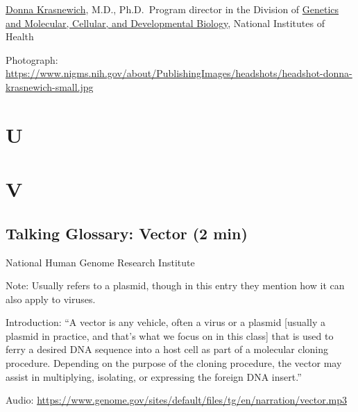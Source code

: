 \documentclass[
]{book}
\begin{document}
\href{https://www.nigms.nih.gov/about/Pages/krasnewich.aspx}{Donna Krasnewich}, M.D., Ph.D.~Program director in the Division of \href{https://www.nigms.nih.gov/about/overview/Pages/GMCDB.aspx}{Genetics and Molecular, Cellular, and Developmental Biology}, National Institutes of Health

Photograph: \url{https://www.nigms.nih.gov/about/PublishingImages/headshots/headshot-donna-krasnewich-small.jpg}

\hypertarget{u}{%
\chapter{U}\label{u}}

\hypertarget{v}{%
\chapter{V}\label{v}}

\hypertarget{talking-glossary-vector-2-min}{%
\section{Talking Glossary: Vector (2 min)}\label{talking-glossary-vector-2-min}}

National Human Genome Research Institute

Note: Usually refers to a plasmid, though in this entry they mention how it can also apply to viruses.

Introduction: ``A vector is any vehicle, often a virus or a plasmid {[}usually a plasmid in practice, and that's what we focus on in this class{]} that is used to ferry a desired DNA sequence into a host cell as part of a molecular cloning procedure. Depending on the purpose of the cloning procedure, the vector may assist in multiplying, isolating, or expressing the foreign DNA insert.''

Audio: \url{https://www.genome.gov/sites/default/files/tg/en/narration/vector.mp3}
\end{document}
